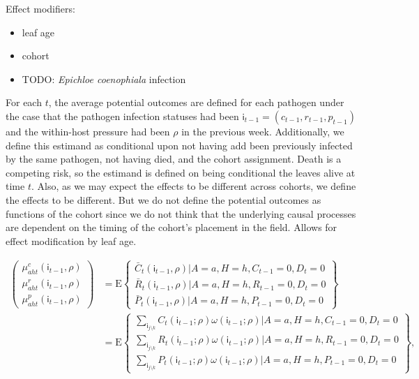 \documentclass[]{article}
\providecommand{\tightlist}{%
  \setlength{\itemsep}{0pt}\setlength{\parskip}{0pt}}
\begin{document}
Effect modifiers:

\begin{itemize}
\tightlist
\item
  leaf age
\item
  cohort
\item
  TODO: \emph{Epichloe coenophiala} infection
\end{itemize}

For each \(t\), the average potential outcomes are defined for each
pathogen under the case that the pathogen infection statuses had been
\(\mathsf{i}_{t - 1} = (c_{t -1}, r_{t-1}, p_{t-1})\) and the
within-host pressure had been \(\rho\) in the previous week.
Additionally, we define this estimand as conditional upon not having add
been previously infected by the same pathogen, not having died, and the
cohort assignment. Death is a competing risk, so the estimand is defined
on being conditional the leaves alive at time \(t\). Also, as we may
expect the effects to be different across cohorts, we define the effects
to be different. But we do not define the potential outcomes as
functions of the cohort since we do not think that the underlying causal
processes are dependent on the timing of the cohort's placement in the
field. Allows for effect modification by leaf age.

\begin{align*}
\begin{pmatrix}
  \mu^c_{aht}(\mathsf{i}_{t-1}, \rho) \\
  \mu^r_{aht}(\mathsf{i}_{t-1}, \rho) \\
  \mu^p_{aht}(\mathsf{i}_{t-1}, \rho) 
\end{pmatrix} &= 
\mathrm{E} 
\left\{ 
\begin{array}{l}
  \bar{C}_{t}(\mathsf{i}_{t-1}, \rho) | A = a, H = h, C_{t-1} = 0, D_t = 0 \\
  \bar{R}_{t}(\mathsf{i}_{t-1}, \rho) | A = a, H = h, R_{t-1} = 0, D_t = 0 \\ 
  \bar{P}_{t}(\mathsf{i}_{t-1}, \rho) | A = a, H = h, P_{t-1} = 0, D_t = 0
\end{array}
\right\} \\
&= 
\mathrm{E} \left\{
\begin{array}{l}
  \sum_{\mathsf{i}_{j \setminus k}} C_{t}(\mathsf{i}_{t-1}; \rho) \omega(\mathsf{i}_{t-1}; \rho) | A = a, H = h, C_{t-1} = 0, D_t = 0 \\
  \sum_{\mathsf{i}_{j \setminus k}} R_{t}(\mathsf{i}_{t-1}; \rho) \omega(\mathsf{i}_{t-1}; \rho) | A = a, H = h, R_{t-1} = 0, D_t = 0 \\ 
  \sum_{\mathsf{i}_{j \setminus k}} P_{t}(\mathsf{i}_{t-1}; \rho) \omega(\mathsf{i}_{t-1}; \rho) | A = a, H = h, P_{t-1} = 0, D_t = 0
\end{array}
\right\}
,
\end{align*}
\end{document}
